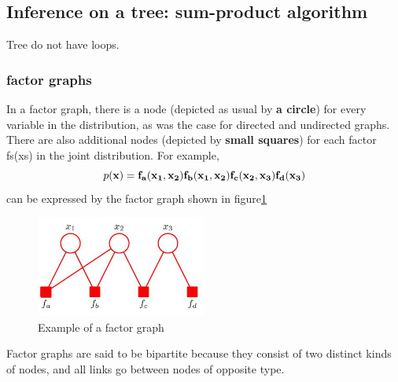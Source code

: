 \documentclass[a4paper]{book}
\begin{document}
\subsection{Inference on a tree: sum-product algorithm}
Tree do not have loops.
\subsubsection{factor graphs}
In a factor graph, there is a node (depicted as usual by \textbf{a circle}) for every variable
in the distribution, as was the case for directed and undirected graphs. There are also
additional nodes (depicted by \textbf{small squares}) for each factor fs(xs) in the joint distribution.\newline
For example,
\begin{equation}\label{eq8.21}
  p(\bf{x}) = f_a(x_1,x_2)f_b(x_1,x_2)f_c(x_2,x_3)f_d(x_3)
\end{equation}
can be expressed by the factor graph shown in figure\ref{GM5}
\begin{figure}
  \centering
  \includegraphics[width=0.5\textwidth]{./imgs/GM5.jpg}
  \caption{Example of a factor graph}\label{GM5}
\end{figure}
Factor graphs are said to be bipartite because they consist of two distinct kinds
of nodes, and all links go between nodes of opposite type.
\end{document}
